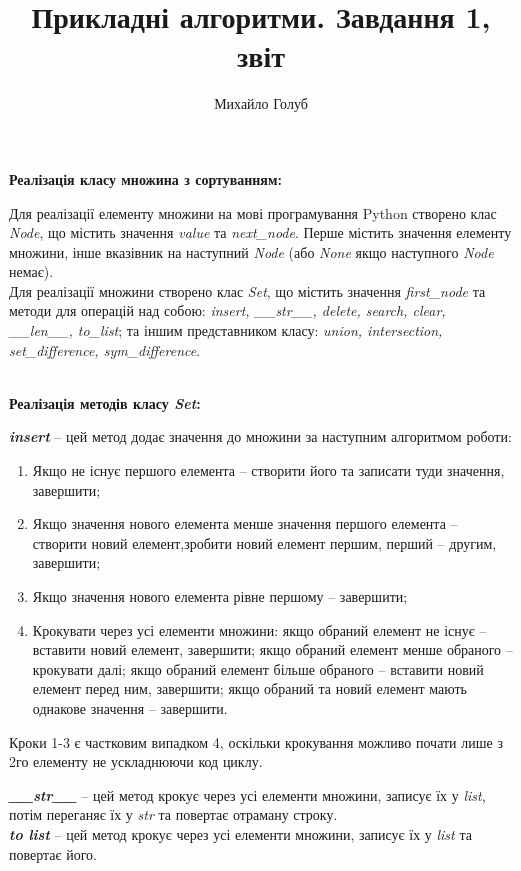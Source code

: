 \documentclass{article}
\title{Прикладні алгоритми. Завдання 1, звіт}
\author{Михайло Голуб}
\begin{document}
\maketitle
\newpage
\textbf{Реалізація класу множина з сортуванням:}
\\\indent

Для реалізації елементу множини на мові програмування Python створено клас \textit{Node}, що містить значення \textit{value} та \textit{next\_node}. Перше містить значення елементу множини, інше вказівник на наступний \textit{Node} (або \textit{None} якщо наступного \textit{Node} немає).\\\indent
Для реалізації множини створено клас \textit{Set}, що містить значення \textit{first\_node} та методи для операцій над собою: \textit{insert, \_\_str\_\_, delete, search, clear, \_\_len\_\_, to\_list}; та іншим представником класу: \textit{union, intersection, set\_difference, sym\_difference}.
\\\\\indent


\textbf{Реалізація методів класу \textit{Set}:}
\\\indent

\textbf{\textit{insert}} -- цей метод додає значення до множини за наступним алгоритмом роботи:
\begin{enumerate}
\item Якщо не існує першого елемента -- створити його та записати туди значення, завершити;
\item Якщо значення нового елемента менше значення першого елемента -- створити новий елемент,зробити новий елемент першим, перший -- другим, завершити;
\item Якщо значення нового елемента рівне першому -- завершити;
\item Крокувати через усі елементи множини: якщо обраний елемент не існує -- вставити новий елемент, завершити; якщо обраний елемент менше обраного -- крокувати далі; якщо обраний елемент більше обраного -- вставити новий елемент перед ним, завершити; якщо обраний та новий елемент мають однакове значення -- завершити.
\end{enumerate}
Кроки 1-3 є частковим випадком 4, оскільки крокування можливо почати лише з 2го елементу не ускладнюючи код циклу.\\\indent

\textbf{\textit{\_\_str\_\_}} -- цей метод крокує через усі елементи множини, записує їх у \textit{list}, потім переганяє їх у \textit{str} та повертає отраману строку.\\\indent
\textbf{\textit{to list}} -- цей метод крокує через усі елементи множини, записує їх у \textit{list} та повертає його.\\\indent
\end{document}

